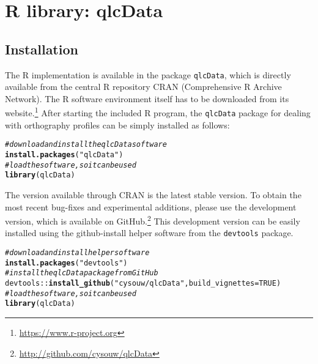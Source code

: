 \documentclass[output=inprep,
		biblatex
		]{LSP/langsci}\usepackage[]{graphicx}\usepackage[]{color}
\makeatletter
\newcommand{\hlnum}[1]{\textcolor[rgb]{0.686,0.059,0.569}{#1}}%
\newcommand{\hlstr}[1]{\textcolor[rgb]{0.192,0.494,0.8}{#1}}%
\newcommand{\hlcom}[1]{\textcolor[rgb]{0.678,0.584,0.686}{\textit{#1}}}%
\newcommand{\hlopt}[1]{\textcolor[rgb]{0,0,0}{#1}}%
\newcommand{\hlstd}[1]{\textcolor[rgb]{0.345,0.345,0.345}{#1}}%
\newcommand{\hlkwc}[1]{\textcolor[rgb]{0.333,0.667,0.333}{#1}}%
\newcommand{\hlkwd}[1]{\textcolor[rgb]{0.737,0.353,0.396}{\textbf{#1}}}%
\newenvironment{kframe}{%
 \def\at@end@of@kframe{}%
 \ifinner\ifhmode%
  \def\at@end@of@kframe{\end{minipage}}%
  \begin{minipage}{\columnwidth}%
 \fi\fi%
 \def\FrameCommand##1{\hskip\@totalleftmargin \hskip-\fboxsep
 \colorbox{shadecolor}{##1}\hskip-\fboxsep
     \hskip-\linewidth \hskip-\@totalleftmargin \hskip\columnwidth}%
 \MakeFramed {\advance\hsize-\width
   \@totalleftmargin\z@ \linewidth\hsize
   \@setminipage}}%
 {\par\unskip\endMakeFramed%
 \at@end@of@kframe}
\newenvironment{knitrout}{}{} %
\makeatother
\begin{document}
\section{R library: qlcData}
\label{r-implementation}

\subsection*{Installation}

The R implementation is available in the package \texttt{qlcData}, which is 
directly available from the central R repository CRAN (Comprehensive R Archive 
Network). The R software environment itself has to be downloaded from its 
website.\footnote{\url{https://www.r-project.org}} After starting the included 
R program, the \texttt{qlcData} package for dealing with orthography profiles can be 
simply installed as follows:

\begin{knitrout}\footnotesize
{}\color{fgcolor}\begin{kframe}
\begin{alltt}
\hlcom{# download and install the qlcData software}
\hlkwd{install.packages}\hlstd{(}\hlstr{"qlcData"}\hlstd{)}
\hlcom{# load the software, so it can be used}
\hlkwd{library}\hlstd{(qlcData)}
\end{alltt}
\end{kframe}
\end{knitrout}

The version available through CRAN is the latest stable version.
To obtain the most recent bug-fixes and experimental additions, please use the
development version, which is available on
GitHub.\footnote{\url{http://github.com/cysouw/qlcData}} This development
version can be easily installed using the github-install helper software from the
\texttt{devtools} package.

\begin{knitrout}\footnotesize
{}\color{fgcolor}\begin{kframe}
\begin{alltt}
\hlcom{# download and install helper software}
\hlkwd{install.packages}\hlstd{(}\hlstr{"devtools"}\hlstd{)}
\hlcom{# install the qlcData package from GitHub}
\hlstd{devtools}\hlopt{::}\hlkwd{install_github}\hlstd{(}\hlstr{"cysouw/qlcData"}\hlstd{,} \hlkwc{build_vignettes} \hlstd{=} \hlnum{TRUE}\hlstd{)}
\hlcom{# load the software, so it can be used}
\hlkwd{library}\hlstd{(qlcData)}
\end{alltt}
\end{kframe}
\end{knitrout}
\end{document}
